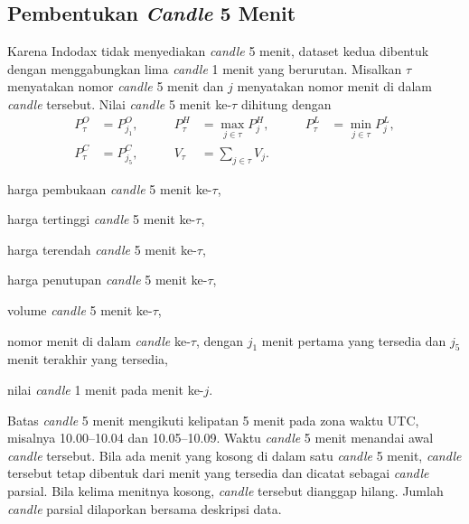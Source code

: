 \subsection{Pembentukan \textit{Candle} 5 Menit}
Karena Indodax tidak menyediakan \textit{candle} 5 menit, dataset kedua
dibentuk dengan menggabungkan lima \textit{candle} 1 menit yang berurutan.
Misalkan $\tau$ menyatakan nomor \textit{candle} 5 menit dan $j$ menyatakan
nomor menit di dalam \textit{candle} tersebut. Nilai \textit{candle} 5 menit
ke-$\tau$ dihitung dengan
\begin{equation}
  \begin{aligned}
    P^{O}_\tau &= P^{O}_{j_1}, &\qquad
    P^{H}_\tau &= \max_{j \in \tau} P^{H}_j, &\qquad
    P^{L}_\tau &= \min_{j \in \tau} P^{L}_j, \\
    P^{C}_\tau &= P^{C}_{j_5}, &\qquad
    V_\tau &= \sum_{j \in \tau} V_j . & &
  \end{aligned}
  \label{eq:agregasi}
\end{equation}
\begin{keterangan}
  \item[$P^{O}_\tau$] harga pembukaan \textit{candle} 5 menit ke-$\tau$,
  \item[$P^{H}_\tau$] harga tertinggi \textit{candle} 5 menit ke-$\tau$,
  \item[$P^{L}_\tau$] harga terendah \textit{candle} 5 menit ke-$\tau$,
  \item[$P^{C}_\tau$] harga penutupan \textit{candle} 5 menit ke-$\tau$,
  \item[$V_\tau$] volume \textit{candle} 5 menit ke-$\tau$,
  \item[$j$] nomor menit di dalam \textit{candle} ke-$\tau$, dengan $j_1$ menit pertama
    yang tersedia dan $j_5$ menit terakhir yang tersedia,
  \item[$P^{O}_j$, $P^{H}_j$, $P^{L}_j$, $P^{C}_j$, $V_j$] nilai
    \textit{candle} 1 menit pada menit ke-$j$.
\end{keterangan}
Batas \textit{candle} 5 menit mengikuti kelipatan 5 menit pada zona waktu UTC,
misalnya 10.00--10.04 dan 10.05--10.09. Waktu \textit{candle} 5 menit menandai
awal \textit{candle} tersebut. Bila ada menit yang kosong di dalam satu
\textit{candle} 5 menit, \textit{candle} tersebut tetap dibentuk dari menit
yang tersedia dan dicatat sebagai \textit{candle} parsial. Bila kelima
menitnya kosong, \textit{candle} tersebut dianggap hilang. Jumlah
\textit{candle} parsial
dilaporkan bersama deskripsi data.


